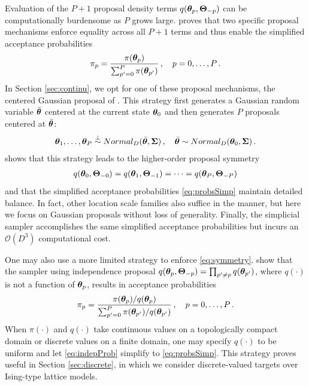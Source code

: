 \documentclass[12pt]{article} %
\begin{document}
\newcommand{\SSigma}{\boldsymbol{\Sigma}}

Evaluation of the $P+1$ proposal density terms $q(\boldsymbol{\theta}_{p},\boldsymbol{\Theta}_{-p})$ can be computationally burdensome as $P$ grows large.  \citet{holbrook2021generating} proves that two specific proposal mechanisms enforce equality across all $P+1$ terms and thus enable the simplified acceptance probabilities
\begin{align}\label{eq:probsSimp}
	\pi_p = \frac{\pi(\boldsymbol{\theta}_p) }{\sum_{p'=0}^P \pi(\boldsymbol{\theta}_{p'})} \, , \quad p=0,\dots,P \, .
\end{align}
In Section \ref{sec:continu}, we opt for one of these proposal mechanisms, the centered Gaussian proposal of \citet{tjelmeland2004using}.  This strategy first generates a Gaussian random variable $\bar{\boldsymbol{\theta}}$ centered at the current state $\boldsymbol{\theta}_{0}$ and then generates $P$ proposals centered at $\bar{\boldsymbol{\theta}}$:
\begin{align}\label{eq:p1}
	\ttheta_1,\dots,\ttheta_P \stackrel{\perp}{\sim} Normal_D(\bar{\ttheta},\SSigma) \, , \quad \bar{\ttheta} \sim Normal_D(\ttheta_{0},\SSigma) \, .
\end{align}
\citet{holbrook2021generating} shows that this strategy leads to the higher-order proposal symmetry
\begin{align}\label{eq:symmetry}
	q(\boldsymbol{\theta}_0,\boldsymbol{\Theta}_{-0}) = q(\boldsymbol{\theta}_{1},\boldsymbol{\Theta}_{-1}) =\dots =q(\boldsymbol{\theta}_{P},\boldsymbol{\Theta}_{-P})  
\end{align}
and that the simplified acceptance probabilities \eqref{eq:probsSimp} maintain detailed balance.  In fact, other location scale families also suffice in the manner, but here we focus on Gaussian proposals without loss of generality.  Finally, the simplicial sampler \citep{holbrook2021generating} accomplishes the same simplified acceptance probabilities but incurs an $\mathcal{O}(D^3)$ computational cost.

One may also use a more limited strategy to enforce \eqref{eq:symmetry}. \citet{glatt} show that the sampler using independence proposal $q(\boldsymbol{\theta}_p,\boldsymbol{\Theta}_{-p})=\prod_{p'\neq p} q(\boldsymbol{\theta}_{p'})$, where $q(\cdot)$ is not a function of $\boldsymbol{\theta}_p$, results in acceptance probabilities
\begin{align}\label{eq:indepProb}
	\pi_p = \frac{\pi(\boldsymbol{\theta}_p) /q(\boldsymbol{\theta}_p)}{\sum_{p'=0}^P \pi(\boldsymbol{\theta}_{p'})/q(\boldsymbol{\theta}_{p'})} \, , \quad p=0,\dots,P \, .
\end{align}
When $\pi(\cdot)$ and $q(\cdot)$ take continuous values on a topologically compact domain or discrete values on a finite domain, one may specify $q(\cdot)$ to be uniform and let \eqref{eq:indepProb} simplify to \eqref{eq:probsSimp}.  This strategy proves useful in Section \ref{sec:discrete}, in which we consider discrete-valued targets over Ising-type lattice models.
\end{document}

